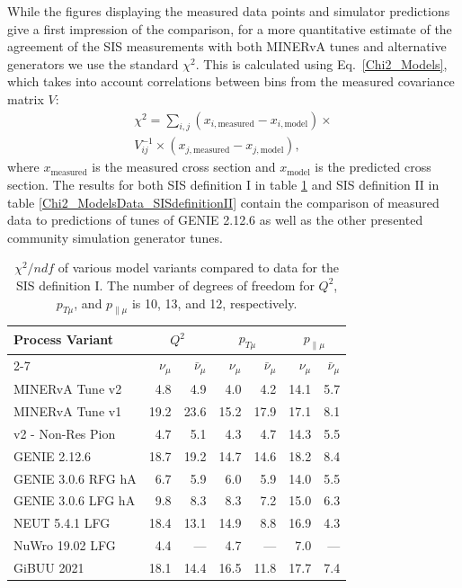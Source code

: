 \documentclass[aps, prd, twocolumn, showpacs, superscriptaddress, floatfix]{revtex4-2}
\begin{document}
While the figures displaying the measured data points and simulator predictions give a first impression of the comparison, for a more quantitative estimate of the agreement of the SIS measurements with both MINERvA tunes and alternative generators we use the standard $\chi^2$. This is calculated using Eq.~\ref{Chi2_Models}, which takes into account correlations between bins from the measured covariance matrix $V$:
\begin{multline}
    \chi^2 =\sum_{i,j} \left( x_{i,\mathrm{measured}} - x_{i,\mathrm{model}} \right) \times \\ V^{-1}_{ij} \times \left( x_{j,\mathrm{measured}} - x_{j,\mathrm{model}} \right),
    \label{Chi2_Models}	
\end{multline}
where $x_\mathrm{measured}$ is the measured cross section and $x_\mathrm{model}$ is the predicted cross section. The results for both SIS definition I in table \ref{Chi2_ModelsData} and SIS definition II in table \ref{Chi2_ModelsData_SISdefinitionII} contain the comparison of measured data to predictions of tunes of GENIE 2.12.6 as well as the other presented community simulation generator tunes.

\begin{table}[htbp]
	\centering
	\begin{tabular}{lrrrrrr}
        \hline\hline
        \multirow{2}{*}{Process Variant} & \multicolumn{2}{c}{$Q^2$} & \multicolumn{2}{c}{$p_{T\mu}$} & \multicolumn{2}{c}{$p_{\parallel{\mu}}$}    \\ \cline{2-7} 
		\multicolumn{1}{c}{}  &	$\nu_\mu$	&	$\bar{\nu}_\mu$	& $\nu_\mu$   &  $\bar{\nu}_\mu$	&	$\nu_\mu$	&	$\bar{\nu}_\mu$    \\	\hline
        MINERvA Tune v2     & 4.8		& 4.9      & 4.0     & 4.2		& 14.1    &	5.7    \\
        MINERvA Tune v1     & 19.2		& 23.6     & 15.2    & 17.9		& 17.1    &	8.1    \\
		v2 - Non-Res Pion   & 4.7		& 5.1	   & 4.3	 & 4.7	    & 14.3    &	5.5    \\ 
		GENIE 2.12.6        & 18.7		& 19.2     & 14.7	 & 14.6	    & 18.2    &	8.4    \\ \hline
		GENIE 3.0.6 RFG hA  & 6.7		& 5.9      & 6.0	 & 5.9		& 14.0    &	5.5    \\
		GENIE 3.0.6 LFG hA  & 9.8		& 8.3      & 8.3	 & 7.2		& 15.0    &	6.3    \\
		NEUT 5.4.1 LFG      & 18.4		& 13.1     & 14.9    & 8.8		& 16.9    & 4.3    \\
		NuWro 19.02 LFG     & 4.4		& ---      & 4.7     & ---      & 7.0     & ---    \\
        GiBUU 2021          & 18.1		& 14.4     & 16.5    & 11.8     & 17.7    & 7.4    \\  \hline\hline
	\end{tabular}
 	\caption{$\chi^2/ndf$ of various model variants compared to data for the SIS definition I. The number of degrees of freedom for $Q^2$, $p_{T\mu}$, and $p_{\parallel\mu}$ is 10, 13, and 12, respectively.}
 	\label{Chi2_ModelsData}	
\end{table}
\end{document}
